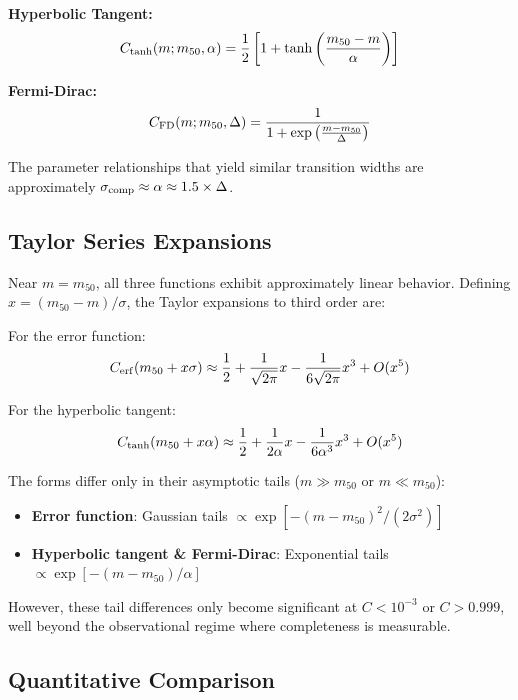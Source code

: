 \documentclass[linenumbers,trackchanges,twocolumn]{aastex701}
\begin{document}
\textbf{Hyperbolic Tangent:}
\begin{equation}
C_{\rm tanh}(m; m_{50}, \alpha) = \frac{1}{2} \left[ 1 + \tanh\left( \frac{m_{50} - m}{\alpha} \right) \right]
\label{eq:app_completeness_tanh}
\end{equation}

\textbf{Fermi-Dirac:}
\begin{equation}
C_{\rm FD}(m; m_{50}, \Delta) = \frac{1}{1 + \exp\left( \frac{m - m_{50}}{\Delta} \right)}
\label{eq:app_completeness_fd}
\end{equation}

The parameter relationships that yield similar transition widths are approximately $\sigma_{\rm comp} \approx \alpha \approx 1.5 \times \Delta$.

\subsection{Taylor Series Expansions}

Near $m = m_{50}$, all three functions exhibit approximately linear behavior. Defining $x = (m_{50} - m)/\sigma$, the Taylor expansions to third order are:

For the error function:
\begin{equation}
C_{\rm erf}(m_{50} + x\sigma) \approx \frac{1}{2} + \frac{1}{\sqrt{2\pi}} x - \frac{1}{6\sqrt{2\pi}} x^3 + O(x^5)
\end{equation}

For the hyperbolic tangent:
\begin{equation}
C_{\rm tanh}(m_{50} + x\alpha) \approx \frac{1}{2} + \frac{1}{2\alpha} x - \frac{1}{6\alpha^3} x^3 + O(x^5)
\end{equation}

The forms differ only in their asymptotic tails ($m \gg m_{50}$ or $m \ll m_{50}$):
\begin{itemize}
\item \textbf{Error function}: Gaussian tails $\propto \exp[-(m-m_{50})^2/(2\sigma^2)]$
\item \textbf{Hyperbolic tangent \& Fermi-Dirac}: Exponential tails $\propto \exp[-(m-m_{50})/\alpha]$
\end{itemize}

However, these tail differences only become significant at $C < 10^{-3}$ or $C > 0.999$, well beyond the observational regime where completeness is measurable.

\subsection{Quantitative Comparison}
\end{document}
